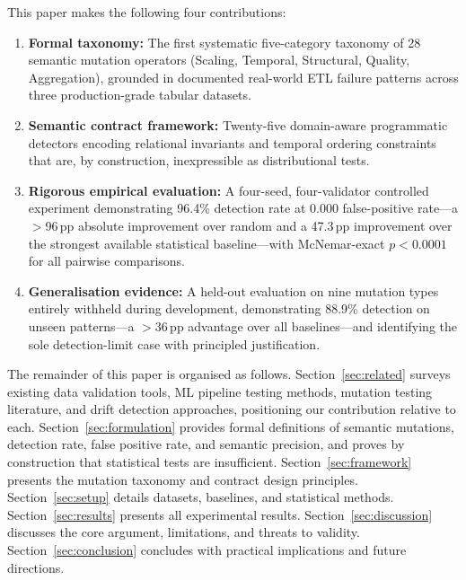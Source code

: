 \documentclass[journal]{IEEEtran}
\begin{document}
This paper makes the following four contributions:

\begin{enumerate}
\item \textbf{Formal taxonomy:} The first systematic five-category taxonomy
  of 28 semantic mutation operators (Scaling, Temporal, Structural, Quality,
  Aggregation), grounded in documented real-world ETL failure patterns across
  three production-grade tabular datasets.

\item \textbf{Semantic contract framework:} Twenty-five domain-aware
  programmatic detectors encoding relational invariants and temporal ordering
  constraints that are, by construction, inexpressible as distributional
  tests.

\item \textbf{Rigorous empirical evaluation:} A four-seed, four-validator
  controlled experiment demonstrating 96.4\% detection rate at 0.000
  false-positive rate---a $>$96\,pp absolute improvement over random and a
  47.3\,pp improvement over the strongest available statistical
  baseline---with McNemar-exact $p < 0.0001$ for all pairwise comparisons.

\item \textbf{Generalisation evidence:} A held-out evaluation on nine
  mutation types entirely withheld during development, demonstrating 88.9\%
  detection on unseen patterns---a $>$36\,pp advantage over all
  baselines---and identifying the sole detection-limit case with principled
  justification.
\end{enumerate}

The remainder of this paper is organised as follows.
Section~\ref{sec:related} surveys existing data validation tools, ML
pipeline testing methods, mutation testing literature, and drift detection
approaches, positioning our contribution relative to each.
Section~\ref{sec:formulation} provides formal definitions of semantic
mutations, detection rate, false positive rate, and semantic precision, and
proves by construction that statistical tests are insufficient.
Section~\ref{sec:framework} presents the mutation taxonomy and contract
design principles.  Section~\ref{sec:setup} details datasets, baselines, and
statistical methods.  Section~\ref{sec:results} presents all experimental
results.  Section~\ref{sec:discussion} discusses the core argument,
limitations, and threats to validity.  Section~\ref{sec:conclusion} concludes
with practical implications and future directions.
\end{document}
